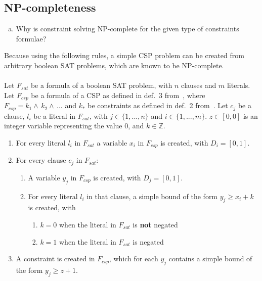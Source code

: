 \subsection{NP-completeness}

\begin{enumerate}[(c)]
\item Why is constraint solving NP-complete for the given type of constraints formulae?
\end{enumerate}

Because using the following rules, a simple CSP problem can be created from arbitrary boolean SAT problems, which are known to be NP-complete.

\paragraph{}
Let $F_{sat}$ be a formula of a boolean SAT problem, with $n$ clauses and $m$ literals.
Let $F_{csp}$ be a formula of a CSP as defined in def.~3 from~\cite{MF19}, where $F_{csp} = k_1 \wedge\, k_2 \wedge\, ...$ and $k_{*}$ be constraints as defined in def.~2 from~\cite{MF19}.
Let $c_j$ be a clause, $l_i$ be a literal in $F_{sat}$, with $j \in \{1,..., n\}$ and $i \in \{1, ..., m\}$.
$z \in [0, 0]$ is an integer variable representing the value 0, and $k \in \mathbb{Z}$.

\begin{enumerate}
    \item For every literal $l_i$ in $F_{sat}$ a variable $x_i$ in $F_{csp}$ is created, with $D_i = [0,1]$.
    \item For every clause $c_j$ in $F_{sat}$:
    \begin{enumerate}
        \item A variable $y_j$ in $F_{csp}$ is created, with $D_j = [0,1]$.
            \item For every literal $l_i$ in that clause, a simple bound of the form $y_j \geq x_i + k$ is created, with
            \begin{enumerate}
                \item $k=0$ when the literal in $F_{sat}$ is \textbf{not} negated
                \item $k=1$ when the literal in $F_{sat}$ is negated
            \end{enumerate}
    \end{enumerate}
    \item A constraint is created in $F_{csp}$, which for each $y_j$ contains a simple bound of the form $y_j \geq z + 1$.
\end{enumerate}

